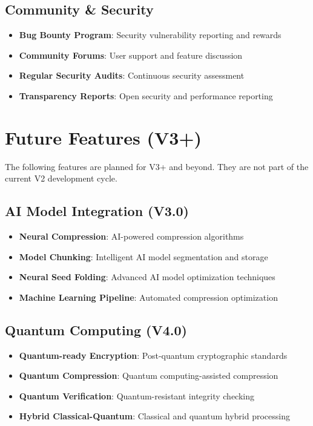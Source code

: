 \documentclass[12pt,a4paper]{article}
\begin{document}
\subsection{Community \& Security}
\begin{itemize}
    \item \textbf{Bug Bounty Program}: Security vulnerability reporting and rewards
    \item \textbf{Community Forums}: User support and feature discussion
    \item \textbf{Regular Security Audits}: Continuous security assessment
    \item \textbf{Transparency Reports}: Open security and performance reporting
\end{itemize}

\section{Future Features (V3+)}

\begin{tcolorbox}[colback=v3green!10,colframe=v3green!50,title=\textbf{Not Yet in V2 - Future Roadmap}]
The following features are planned for V3+ and beyond. They are not part of the current V2 development cycle.
\end{tcolorbox}

\subsection{AI Model Integration (V3.0)}
\begin{itemize}
    \item \textbf{Neural Compression}: AI-powered compression algorithms
    \item \textbf{Model Chunking}: Intelligent AI model segmentation and storage
    \item \textbf{Neural Seed Folding}: Advanced AI model optimization techniques
    \item \textbf{Machine Learning Pipeline}: Automated compression optimization
\end{itemize}

\subsection{Quantum Computing (V4.0)}
\begin{itemize}
    \item \textbf{Quantum-ready Encryption}: Post-quantum cryptographic standards
    \item \textbf{Quantum Compression}: Quantum computing-assisted compression
    \item \textbf{Quantum Verification}: Quantum-resistant integrity checking
    \item \textbf{Hybrid Classical-Quantum}: Classical and quantum hybrid processing
\end{itemize}
\end{document}
